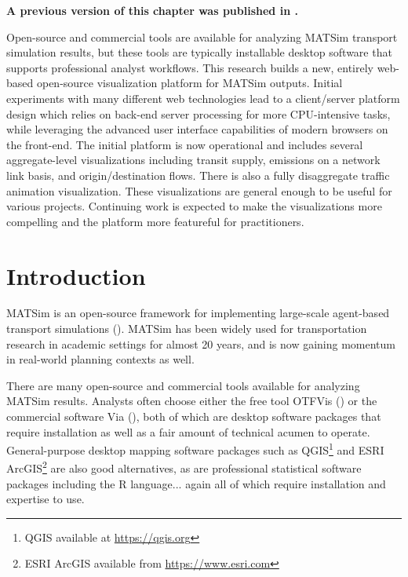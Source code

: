 \textbf{A previous version of this chapter was published in \citet{CharltonLaudan2020WebBasedVisualization}.}

\vspace{5mm}

Open-source and commercial tools are available for analyzing MATSim transport simulation results, but these tools are typically installable desktop software that supports professional analyst workflows. This research builds a new, entirely web-based open-source visualization platform for MATSim outputs. Initial experiments with many different web technologies lead to a client/server platform design which relies on back-end server processing for more CPU-intensive tasks, while leveraging the advanced user interface capabilities of modern browsers on the front-end. The initial platform is now operational and includes several aggregate-level visualizations including transit supply, emissions on a network link basis, and origin/destination flows. There is also a fully disaggregate traffic animation visualization. These visualizations are general enough to be useful for various projects. Continuing work is expected to make the visualizations more compelling and the platform more featureful for practitioners.

\hypertarget{mathub-introduction}{%
\section{Introduction}\label{introduction}}

MATSim is an open-source framework for implementing large-scale agent-based transport simulations (\cite{MATSimBook}). MATSim has been widely used for transportation research in academic settings for almost 20 years, and is now gaining momentum in real-world planning contexts as well.

There are many open-source and commercial tools available for analyzing MATSim results. Analysts often choose either the free tool OTFVis (\cite{Srippgen2015OTFVisInBook}) or the commercial software Via (\cite{Rieser2015SenozonViaInBook}), both of which are desktop software packages that require installation as well as a fair amount of technical acumen to operate. General-purpose desktop mapping software packages such as QGIS\footnote{QGIS available at \url{https://qgis.org}} and ESRI ArcGIS\footnote{ESRI ArcGIS available from \url{https://www.esri.com}} are also good alternatives, as are professional statistical software packages including the R language... again all of which require installation and expertise to use.

